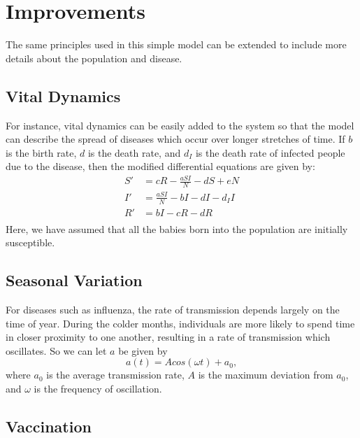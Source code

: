 \documentclass[prb,aps,twocolumn,showpacs,10pt]{revtex4-1}
\begin{document}
\section{Improvements}
The same principles used in this simple model can be extended to include more details about the population and disease.
\subsection{Vital Dynamics}
For instance, vital dynamics can be easily added to the system so that the model can describe the spread of diseases which occur over longer stretches of time. If $b$ is the birth rate, $d$ is the death rate, and $d_I$ is the death rate of infected people due to the disease, then the modified differential equations are given by:
\begin{equation}
\begin{split}
S'&=cR-\frac{aSI}{N}-dS+eN\\
I'&=\frac{aSI}{N}-bI-dI-d_I I\\
R'&=bI-cR-dR\\
\end{split}
\end{equation}
Here, we have assumed that all the babies born into the population are initially susceptible. 

\subsection{Seasonal Variation}

For diseases such as influenza, the rate of transmission depends largely on the time of year. During the colder months, individuals are more likely to spend time in closer proximity to one another, resulting in a rate of transmission which oscillates. So we can let $a$ be given by
\begin{equation}
a(t)=Acos(\omega t) + a_0,
\end{equation}
where $a_0$ is the average transmission rate, $A$ is the maximum deviation from $a_0$, and $\omega$ is the frequency of oscillation.\\

\subsection{Vaccination}
\end{document}
